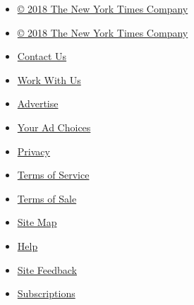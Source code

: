 \begin{itemize}
\tightlist
\item
  \href{http://www.nytco.com}{© 2018 The New York Times Company}
\end{itemize}

\begin{itemize}
\tightlist
\item
  \href{http://www.nytco.com}{© 2018 The New York Times Company}
\item
  \href{http://www.nytimes.com/ref/membercenter/help/infoservdirectory.html}{Contact
  Us}
\item
  \href{http://www.nytco.com/careers}{Work With Us}
\item
  \href{http://www.nytimes.whsites.net/mediakit}{Advertise}
\item
  \href{http://www.nytimes.com/content/help/rights/privacy/policy/privacy-policy.html\#pp}{Your
  Ad Choices}
\item
  \href{http://www.nytimes.com/privacy}{Privacy}
\item
  \href{http://www.nytimes.com/ref/membercenter/help/agree.html}{Terms
  of Service}
\item
  \href{http://www.nytimes.com/content/help/rights/sale/terms-of-sale.html}{Terms
  of Sale}
\end{itemize}

\begin{itemize}
\tightlist
\item
  \href{http://spiderbites.nytimes.com}{Site Map}
\item
  \href{http://www.nytimes.com/membercenter/sitehelp.html}{Help}
\item
  \href{https://myaccount.nytimes.com/membercenter/feedback.html}{Site
  Feedback}
\item
  \href{http://www.nytimes.com/subscriptions/Multiproduct/lp5558.html?campaignId=37WXW}{Subscriptions}
\end{itemize}
